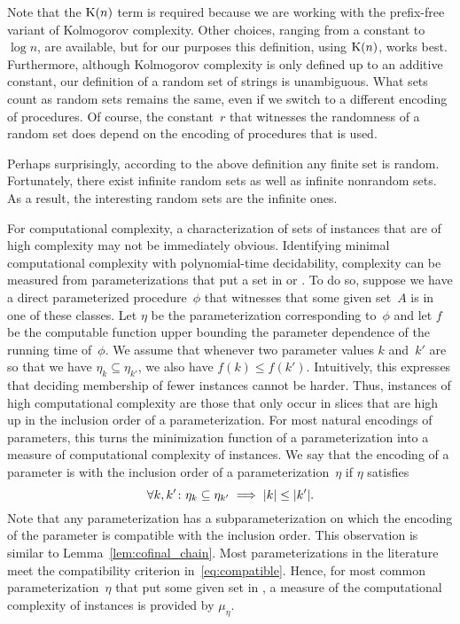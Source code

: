 Note that the $\operatorname{K}(n)$ term is required because we are working with the prefix-free variant of Kolmogorov complexity.
Other choices, ranging from a constant to $\log n$, are available, but for our purposes this definition, using $\operatorname{K}(n)$, works best.
Furthermore, although Kolmogorov complexity is only defined up to an additive constant, our definition of a random set of strings is unambiguous.
What sets count as random sets remains the same, even if we switch to a different encoding of procedures.
Of course, the constant~$r$ that witnesses the randomness of a random set does depend on the encoding of procedures that is used.

Perhaps surprisingly, according to the above definition any finite set is random.
Fortunately, there exist infinite random sets as well as infinite nonrandom sets.
As a result, the interesting random sets are the infinite ones.

For computational complexity, a characterization of sets of instances that are of high complexity may not be immediately obvious.
Identifying minimal computational complexity with polynomial-time decidability, complexity can be measured from parameterizations that put a set in  or .
To do so, suppose we have a direct parameterized procedure~$\phi$ that witnesses that some given set~$A$ is in one of these classes.
Let $\eta$ be the parameterization corresponding to~$\phi$ and let $f$ be the computable function upper bounding the parameter dependence of the running time of~$\phi$.
We assume that whenever two parameter values $k$ and~$k'$ are so that we have $\eta_k \subseteq \eta_{k'}$, we also have $f(k) \le f(k')$.
Intuitively, this expresses that deciding membership of fewer instances cannot be harder.
Thus, instances of high computational complexity are those that only occur in slices that are high up in the inclusion order of a parameterization.
For most natural encodings of parameters, this turns the minimization function of a parameterization into a measure of computational complexity of instances.
We say that the encoding of a parameter is  with the inclusion order of a parameterization~$\eta$ if $\eta$ satisfies
\begin{equation}
\label{eq:compatible}
  \forall k, k'\colon \eta_k \subseteq \eta_{k'} \implies {\lvert k\rvert} \le {\lvert k'\rvert}.
\end{equation}
Note that any parameterization has a subparameterization on which the encoding of the parameter is compatible with the inclusion order.
This observation is similar to Lemma~\ref{lem:cofinal_chain}.
Most parameterizations in the literature \parencite[e.g.][]{downey1999parameterized,flum2006parameterized,niedermeier2006invitation,cygan2015parameterized} meet the compatibility criterion in~\eqref{eq:compatible}.
Hence, for most common parameterization~$\eta$ that put some given set in , a measure of the computational complexity of instances is provided by $\mu_\eta$.

